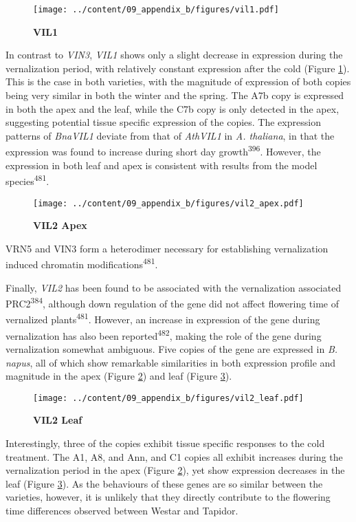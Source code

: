 \documentclass[12pt,]{book}
\begin{document}
\begin{figure}[htbp]
\centering
\texttt{[image: ../content/09\_appendix\_b/figures/vil1.pdf]}
\caption{\textbf{VIL1}}\label{figure:3xx:vil1}
\end{figure}

In contrast to \emph{VIN3}, \emph{VIL1} shows only a slight decrease in
expression during the vernalization period, with relatively constant
expression after the cold (Figure \ref{figure:3xx:vil1}). This is the
case in both varieties, with the magnitude of expression of both copies
being very similar in both the winter and the spring. The A7b copy is
expressed in both the apex and the leaf, while the C7b copy is only
detected in the apex, suggesting potential tissue specific expression of
the copies. The expression patterns of \emph{BnaVIL1} deviate from that
of \emph{AthVIL1} in \emph{A. thaliana}, in that the expression was
found to increase during short day growth\textsuperscript{396}. However,
the expression in both leaf and apex is consistent with results from the
model species\textsuperscript{481}.

\begin{figure}[htbp]
\centering
\texttt{[image: ../content/09\_appendix\_b/figures/vil2\_apex.pdf]}
\caption{\textbf{VIL2 Apex}}\label{figure:3xx:vil2apex}
\end{figure}

VRN5 and VIN3 form a heterodimer necessary for establishing
vernalization induced chromatin modifications\textsuperscript{481}.

Finally, \emph{VIL2} has been found to be associated with the
vernalization associated PRC2\textsuperscript{384}, although down
regulation of the gene did not affect flowering time of vernalized
plants\textsuperscript{481}. However, an increase in expression of the
gene during vernalization has also been reported\textsuperscript{482},
making the role of the gene during vernalization somewhat ambiguous.
Five copies of the gene are expressed in \emph{B. napus}, all of which
show remarkable similarities in both expression profile and magnitude in
the apex (Figure \ref{figure:3xx:vil2apex}) and leaf (Figure
\ref{figure:3xx:vil2leaf}).

\begin{figure}[htbp]
\centering
\texttt{[image: ../content/09\_appendix\_b/figures/vil2\_leaf.pdf]}
\caption{\textbf{VIL2 Leaf}}\label{figure:3xx:vil2leaf}
\end{figure}

Interestingly, three of the copies exhibit tissue specific responses to
the cold treatment. The A1, A8, and Ann, and C1 copies all exhibit
increases during the vernalization period in the apex (Figure
\ref{figure:3xx:vil2apex}), yet show expression decreases in the leaf
(Figure \ref{figure:3xx:vil2leaf}). As the behaviours of these genes are
so similar between the varieties, however, it is unlikely that they
directly contribute to the flowering time differences observed between
Westar and Tapidor.
\end{document}

